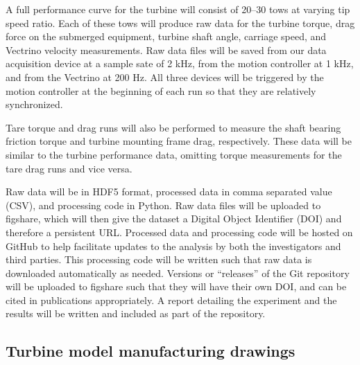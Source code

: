 \documentclass[12pt]{report}
\begin{document}
A full performance curve for the turbine will consist of 20--30 tows at varying
tip speed ratio. Each of these tows will produce raw data for the turbine
torque, drag force on the submerged equipment, turbine shaft angle, carriage
speed, and Vectrino velocity measurements. Raw data files will be saved from our
data acquisition device at a sample sate of 2 kHz, from the motion controller at
1 kHz, and from the Vectrino at 200 Hz. All three devices will be triggered by
the motion controller at the beginning of each run so that they are relatively
synchronized.

Tare torque and drag runs will also be performed to measure the shaft bearing
friction torque and turbine mounting frame drag, respectively. These data will
be similar to the turbine performance data, omitting torque measurements for the
tare drag runs and vice versa.

Raw data will be in HDF5 format, processed data in comma separated value (CSV),
and processing code in Python. Raw data files will be uploaded to figshare,
which will then give the dataset a Digital Object Identifier (DOI) and therefore
a persistent URL. Processed data and processing code will be hosted on GitHub to
help facilitate updates to the analysis by both the investigators and third
parties. This processing code will be written such that raw data is downloaded
automatically as needed. Versions  or ``releases'' of the Git repository will be
uploaded to figshare such that they will have their own DOI, and can be cited in
publications appropriately. A report detailing the experiment and the results
will be written and included as part of the repository.

\renewcommand{\bibname}{References}



\begin{appendices}

\chapter{Turbine model manufacturing drawings}

\label{app-turbine_dwgs}



\end{appendices}
\end{document}
